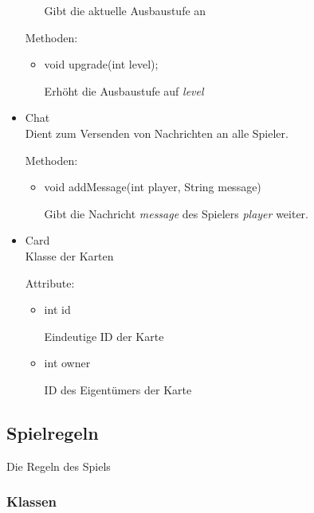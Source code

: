 \documentclass[a4paper,10pt]{article}
\begin{document}
\begin{itemize}
\begin{itemize}
Gibt die aktuelle Ausbaustufe an
\end{itemize} %

Methoden:
\begin{itemize}
\item void upgrade(int level);

Erhöht die Ausbaustufe auf \textit{level}
\end{itemize} %

\item Chat \\
Dient zum Versenden von Nachrichten an alle Spieler.

Methoden:
\begin{itemize}
\item void addMessage(int player, String message)

Gibt die Nachricht \textit{message} des Spielers \textit{player} weiter.
\end{itemize}

\item Card \\
Klasse der Karten

Attribute:
\begin{itemize}
\item int id

Eindeutige ID der Karte
\item int owner

ID des Eigentümers der Karte
\end{itemize}
\end{itemize}


\subsection{Spielregeln}


Die Regeln des Spiels

\subsubsection{Klassen}
\end{document}
